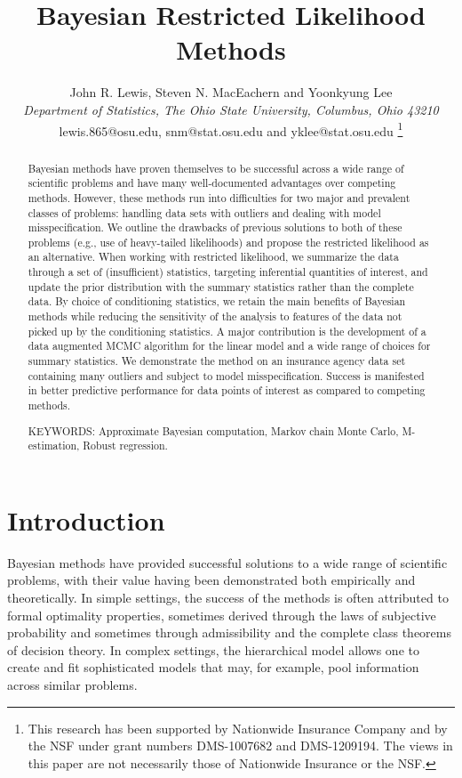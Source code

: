 \documentclass[12pt]{article}
\title{Bayesian Restricted Likelihood Methods}
\author{John R. Lewis, Steven N. MacEachern and  Yoonkyung Lee \\
{\small \it Department of Statistics, The Ohio State University, Columbus, Ohio 43210}\\
{\small lewis.865@osu.edu, snm@stat.osu.edu and yklee@stat.osu.edu}
\thanks{This research has been supported by Nationwide Insurance Company and by the NSF under grant numbers DMS-1007682 and DMS-1209194.  The views in this paper are not necessarily those of Nationwide Insurance or the NSF.}}
\begin{document}
\date{}
\maketitle

\begin{abstract}
Bayesian methods have proven themselves to be successful across a wide
range of scientific problems and have many well-documented advantages
over competing methods. However, these methods run into difficulties
for two major and prevalent classes of problems: handling data sets
with outliers and dealing with model misspecification. We outline the
drawbacks of previous solutions to both of these problems (e.g., use of
heavy-tailed likelihoods) and propose the restricted likelihood as an
alternative.  When working with restricted likelihood, we summarize
the data through a set of (insufficient) statistics,
targeting inferential quantities of interest, and update the prior
distribution with the summary statistics rather than the complete
data.  By choice of conditioning statistics, we
retain the main benefits of Bayesian methods while reducing the
sensitivity of the analysis to features of the data not picked up by
the conditioning statistics. A major
contribution is the development of a data augmented MCMC algorithm
for the linear model and a wide range of choices for
summary statistics. We demonstrate the method on an
insurance agency data set containing many outliers and subject to model
misspecification. Success is manifested in better predictive
performance for data points of interest as compared to competing
methods.

\noindent KEYWORDS: Approximate Bayesian computation, Markov chain
Monte Carlo, M-estimation, Robust regression.


\end{abstract}

\section{Introduction}

Bayesian methods have provided successful solutions to a wide range of scientific problems, with their value
having been demonstrated both empirically and theoretically.  
In simple settings, the success of the methods is often attributed to formal optimality properties, sometimes derived
through the laws of subjective probability 
and sometimes through admissibility and the complete class
theorems of decision theory.  In complex settings, the hierarchical model allows one to create 
and fit sophisticated models that may, for example, pool information across similar problems.  
\end{document}
